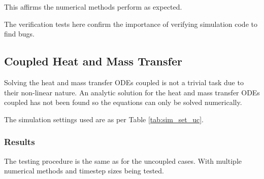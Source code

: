 \documentclass[../Interim_Report_Master]{subfiles}
\begin{document}
This affirms the numerical methods perform as expected.

The verification tests here confirm the importance of verifying simulation code to find bugs.

\subsection{Coupled Heat and Mass Transfer}
Solving the heat and mass transfer ODEs coupled is not a trivial task due to their non-linear nature. An analytic solution for the heat and mass transfer ODEs coupled has not been found so the equations can only be solved numerically. 

The simulation settings used are as per Table \ref{tab:sim_set_uc}. 

\subsubsection{Results}
The testing procedure is the same as for the uncoupled cases. With multiple numerical methods and timestep sizes being tested.
\end{document}
